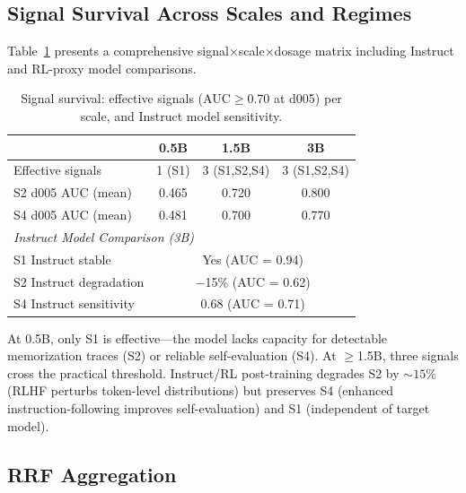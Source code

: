 \documentclass[11pt,a4paper]{article}
\begin{document}
\subsection{Signal Survival Across Scales and Regimes}
\label{sec:survival}

Table~\ref{tab:signal_survival} presents a comprehensive signal$\times$scale$\times$dosage matrix including Instruct and RL-proxy model comparisons.

\begin{table}[t]
\centering
\small
\caption{Signal survival: effective signals (AUC$\geq$0.70 at d005) per scale, and Instruct model sensitivity.}
\label{tab:signal_survival}
\begin{tabular}{lccc}
\toprule
& 0.5B & 1.5B & 3B \\
\midrule
Effective signals & 1 (S1) & 3 (S1,S2,S4) & 3 (S1,S2,S4) \\
S2 d005 AUC (mean) & 0.465 & 0.720 & 0.800 \\
S4 d005 AUC (mean) & 0.481 & 0.700 & 0.770 \\
\midrule
\multicolumn{4}{l}{\textit{Instruct Model Comparison (3B)}} \\
\midrule
S1 Instruct stable & \multicolumn{3}{c}{Yes (AUC = 0.94)} \\
S2 Instruct degradation & \multicolumn{3}{c}{$-$15\% (AUC = 0.62)} \\
S4 Instruct sensitivity & \multicolumn{3}{c}{0.68 (AUC = 0.71)} \\
\bottomrule
\end{tabular}
\end{table}

At 0.5B, only S1 is effective---the model lacks capacity for detectable memorization traces (S2) or reliable self-evaluation (S4).
At $\geq$1.5B, three signals cross the practical threshold.
Instruct/RL post-training degrades S2 by ${\sim}15\%$ (RLHF perturbs token-level distributions) but preserves S4 (enhanced instruction-following improves self-evaluation) and S1 (independent of target model).


\subsection{RRF Aggregation}
\label{sec:rrf}
\end{document}
